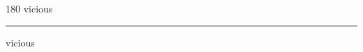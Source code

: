 
\begin{frame}
\begin{center}
\begin{turn}{180}
{\fontsize{2.5cm}{1em}\selectfont vicious}
\end{turn}
\vspace{1em}\par  
\hrule
\vspace{1em}\par  
{\fontsize{2.5cm}{1em}\selectfont vicious}
\end{center}
\end{frame}
